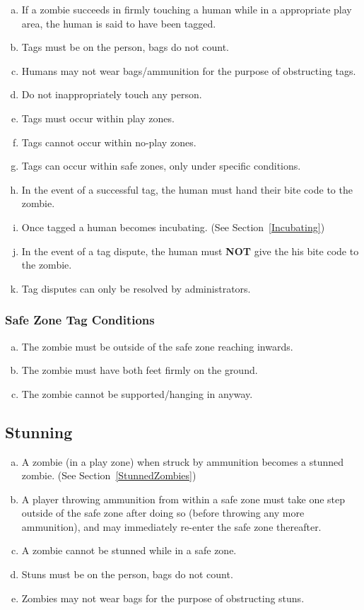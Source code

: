 \documentclass[a4paper,12pt]{article}
\begin{document}
\begin{enumerate}[(a)]
    \item If a zombie succeeds in firmly touching a human while in a appropriate play area, the human is said to have been tagged.
    \item Tags must be on the person, bags do not count.
    \item Humans may not wear bags/ammunition for the purpose of obstructing tags.
    \item Do not inappropriately touch any person.
    \item Tags must occur within play zones.
    \item Tags cannot occur within no-play zones.
    \item Tags can occur within safe zones, only under specific conditions. 
    \item In the event of a successful tag, the human must hand their bite code to the zombie.    
    \item Once tagged a human becomes incubating. (See Section~\ref{Incubating})
    \item In the event of a tag dispute, the human must {\bf NOT} give the his bite code to the zombie.
    \item Tag disputes can only be resolved by administrators.   
\end{enumerate}

\subsubsection{Safe Zone Tag Conditions}

\begin{enumerate}[(a)]
    \item The zombie must be outside of the safe zone reaching inwards.
    \item The zombie must have both feet firmly on the ground.  
    \item The zombie cannot be supported/hanging in anyway.
\end{enumerate}


\subsection{Stunning}

\begin{enumerate}[(a)]
    \item A zombie (in a play zone) when struck by ammunition becomes a stunned zombie. (See Section~\ref{StunnedZombies})
    \item A player throwing ammunition from within a safe zone must take one step outside of the safe zone after doing so (before throwing any more ammunition), and may immediately re-enter the safe zone thereafter.
    \item A zombie cannot be stunned while in a safe zone.
    \item Stuns must be on the person, bags do not count.
    \item Zombies may not wear bags for the purpose of obstructing stuns.
\end{enumerate}
\end{document}
